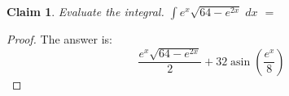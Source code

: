 \documentclass{article}
\newtheorem{theorem}{Claim}
\begin{document}
\begin{theorem}
Evaluate the integral. $ \int e^{x}\sqrt{64-e^{2x}} \;dx$ $=$
\end{theorem}

\begin{proof}
The answer is:
\[
\frac{e^{x} \sqrt{64 - e^{2 x}}}{2} + 32 \operatorname{asin}{\left(\frac{e^{x}}{8} \right)}
\]
\end{proof}
\end{document}
